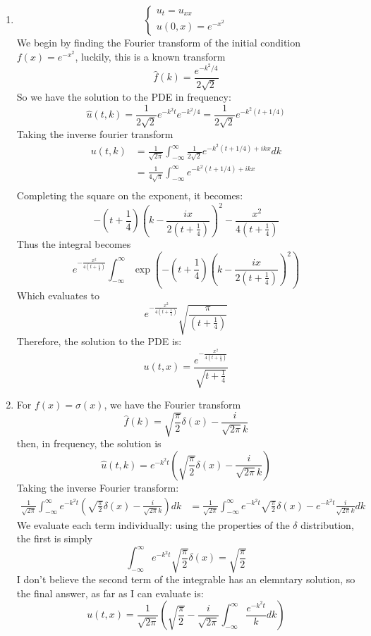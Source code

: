 \documentclass{article} %
\begin{document}
\begin{enumerate}
  \item
    \[
      \begin{cases}
        u_t = u_{xx} \\
        u(0,x) = e^{-x^2}
      \end{cases}
    \]
    We begin by finding the Fourier transform of the initial
    condition $f(x) = e^{-x^2}$, luckily, this is a known transform
    \[
      \hat f(k) = \frac{e^{-k^2/4}}{2\sqrt{2}}
    \]
    So we have the solution to the PDE in frequency:
    \[
      \hat u(t,k) = \frac{1}{2\sqrt{2}}e^{-k^2t}e^{-k^2/4} =
      \frac{1}{2\sqrt{2}}e^{-k^2(t + 1/4)}
    \]
    Taking the inverse fourier transform
    \begin{align*}
      u(t,k) &= \frac{1}{\sqrt{2\pi}}\int_{-\infty}^\infty
      \frac{1}{2\sqrt{2}}e^{-k^2(t + 1/4) + ikx} dk\\
      &= \frac{1}{4\sqrt{\pi}}\int_{-\infty}^\infty
      e^{-k^2(t + 1/4) + ikx}\\
    \end{align*}
    Completing the square on the exponent, it becomes:
    \[
      -\left(t+\frac{1}{4}\right)\left(k-\frac{ix}{2(t+\frac{1}{4})}\right)^2
      - \frac{x^2}{4(t + \frac{1}{4})}
    \]
    Thus the integral becomes
    \[
      e^{ - \frac{x^2}{4(t + \frac{1}{4})}}\int_{-\infty}^\infty
      \exp\left(-\left(t+\frac{1}{4}\right)\left(k-\frac{ix}{2(t+\frac{1}{4})}\right)^2\right)
    \]
    Which evaluates to
    \[
      e^{ - \frac{x^2}{4(t + \frac{1}{4})}}
      \sqrt{\frac{\pi}{(t+\frac{1}{4})}}
    \]
    Therefore, the solution to the PDE is:
    \[
      u(t,x) = \frac{e^{ - \frac{x^2}{4(t +
      \frac{1}{4})}}}{\sqrt{t+\frac{1}{4}}}
    \]
  \item For $f(x) = \sigma(x)$, we have the Fourier transform
    \[
      \hat f(k) = \sqrt{\frac{\pi}{2}}\delta(x) - \frac{i}{\sqrt{2\pi}k}
    \]
    then, in frequency, the solution is
    \[
      \hat u(t,k) = e^{-k^2t}\left(\sqrt{\frac{\pi}{2}}\delta(x) -
      \frac{i}{\sqrt{2\pi}k}\right)
    \]
    Taking the inverse Fourier transform:
    \begin{align*}
      \frac{1}{\sqrt{2\pi}}\int_{-\infty}^\infty
      e^{-k^2t}\left(\sqrt{\frac{\pi}{2}}\delta(x) -
      \frac{i}{\sqrt{2\pi}k}\right) dk &=
      \frac{1}{\sqrt{2\pi}}\int_{-\infty}^\infty
      e^{-k^2t}\sqrt{\frac{\pi}{2}}\delta(x) -
      e^{-k^2t}\frac{i}{\sqrt{2\pi}k} dk
    \end{align*}
    We evaluate each term individually: using the properties of the
    $\delta$ distribution, the first is simply
    \[
      \int_{-\infty}^\infty e^{-k^2t}\sqrt{\frac{\pi}{2}}\delta(x) =
      \sqrt{\frac{\pi}{2}}
    \]
    I don't believe the second term of the integrable has an
    elemntary solution, so the final answer, as far as I can evaluate is:
    \[
      u(t,x) = \frac{1}{\sqrt{2\pi}}\left(\sqrt{\frac{\pi}{2}} -
      \frac{i}{\sqrt{2\pi}}\int_{-\infty}^\infty \frac{e^{-k^2t}}{k}dk\right)
    \]

\end{enumerate}
\end{document}

